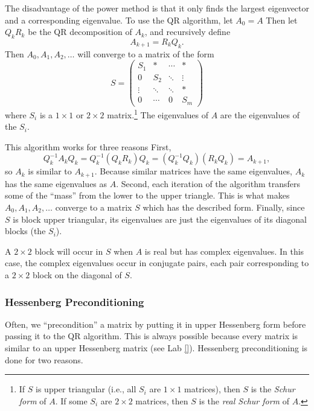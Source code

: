 The disadvantage of the power method is that it only finds the largest eigenvector and a corresponding eigenvalue.
To use the QR algorithm, let $A_0=A$
Then let $Q_kR_k$ be the QR decomposition of $A_k$, and recursively define
\[
A_{k+1}=R_kQ_k.
\]
Then $A_0, A_1, A_2, \ldots $ will converge to a matrix of the form
\begin{equation*}
\label{eq:Schur form}
S =
     \begin{pmatrix}
          S_1 &* & \cdots & * \\
           0     &S_2  &  \ddots & \vdots \\
           \vdots  & \ddots & \ddots & *  \\
           0 & \cdots & 0 & S_m
    \end{pmatrix}
\end{equation*}
where $S_i$ is a $1\times1$ or $2\times2$ matrix.\footnote{If $S$ is upper triangular (i.e., all $S_i$ are $1\times1$ matrices), then $S$ is the \emph{Schur form} of $A$.
If some $S_i$ are $2\times2$ matrices, then $S$ is the \emph{real Schur form} of $A$.}
The eigenvalues of $A$ are the eigenvalues of the $S_i$.

This algorithm works for three reasons
First,
\[
Q_k^{-1}A_kQ_k = Q_k^{-1}(Q_kR_k)Q_k = (Q_k^{-1}Q_k)(R_kQ_k) = A_{k+1},
\]
so $A_k$ is similar to $A_{k+1}$.
Because similar matrices have the same eigenvalues, $A_k$ has the same eigenvalues as $A$.
Second, each iteration of the algorithm transfers some of the ``mass'' from the lower to the upper triangle.
This is what makes $A_0, A_1, A_2, \ldots$ converge to a matrix $S$ which has the described form.
Finally, since $S$ is block upper triangular, its eigenvalues are just the eigenvalues of its diagonal blocks (the $S_i$).

A $2 \times 2$ block will occur in $S$ when $A$ is real but has complex eigenvalues.
In this case, the complex eigenvalues occur in conjugate pairs, each pair corresponding to a $2 \times 2$ block on the diagonal of $S$.

\subsubsection*{Hessenberg Preconditioning} %

Often, we ``precondition'' a matrix by putting it in upper Hessenberg form before passing it to the QR algorithm.
This is always possible because every matrix is similar to an upper Hessenberg matrix (see Lab \ref{}).
Hessenberg preconditioning is done for two reasons.

